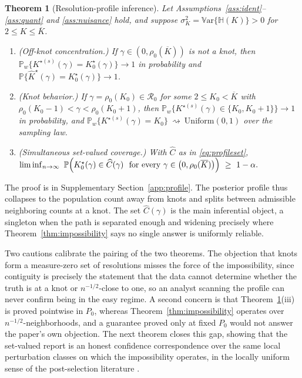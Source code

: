 \documentclass[11pt]{article}
\newtheorem{theorem}{Theorem}%
\newcommand{\Pp}{\mathbb P}
\newcommand{\Var}{\mathbb V\mathrm{ar}}
\newcommand{\dto}{\rightsquigarrow}
\begin{document}
\begin{theorem}[Resolution-profile inference]\label{thm:profile}
Let Assumptions~\ref{ass:ident}--\ref{ass:quant} and \ref{ass:nuisance} hold, and suppose $\sigma_K^2=\Var\{\mathbb H(K)\}>0$ for $2\le K\le\overline K$.
\begin{enumerate}[label=(\roman*),leftmargin=2em]
\item \textup{(Off-knot concentration.)} If $\gamma\in(0,\rho_0(\overline K))$ is not a knot, then $\Pp_w\{K^{\star(s)}(\gamma)=K^\star_0(\gamma)\}\to1$ in probability and $\Pp\{\widehat K^\star(\gamma)=K^\star_0(\gamma)\}\to1$.
\item \textup{(Knot behavior.)} If $\gamma=\rho_0(K_0)\in\mathcal R_0$ for some $2\le K_0<\overline K$ with $\rho_0(K_0-1)<\gamma<\rho_0(K_0+1)$, then $\Pp_w\{K^{\star(s)}(\gamma)\in\{K_0,K_0+1\}\}\to1$ in probability, and $\Pp_w\bigl\{K^{\star(s)}(\gamma)=K_0\bigr\}\ \dto\ \mathrm{Uniform}(0,1)$
over the sampling law.
\item \textup{(Simultaneous set-valued coverage.)} With $\widehat C$ as in \eqref{eq:profileset}, $\liminf_{n\to\infty}\ \Pp\Bigl(K^\star_0(\gamma)\in\widehat C(\gamma)\ \text{ for every }\gamma\in\bigl(0,\rho_0(\overline K)\bigr)\Bigr)\ \ge\ 1-\alpha .$
\end{enumerate}
\end{theorem}
The proof is in Supplementary Section~\ref{app:profile}. The posterior profile thus collapses to the population count away from knots and splits between admissible neighboring counts at a knot. The set $\widehat C(\gamma)$ is the main inferential object, a singleton when the path is separated enough and widening precisely where Theorem~\ref{thm:impossibility} says no single answer is uniformly reliable.

Two cautions calibrate the pairing of the two theorems. The objection that knots form a measure-zero set of resolutions misses the force of the impossibility, since contiguity is precisely the statement that the data cannot determine whether the truth is at a knot or $n^{-1/2}$-close to one, so an analyst scanning the profile can never confirm being in the easy regime. A second concern is that Theorem~\ref{thm:profile}(iii) is proved pointwise in $P_0$, whereas Theorem~\ref{thm:impossibility} operates over $n^{-1/2}$-neighborhoods, and a guarantee proved only at fixed $P_0$ would not answer the paper's own objection. The next theorem closes this gap, showing that the set-valued report is an honest confidence correspondence over the same local perturbation classes on which the impossibility operates, in the locally uniform sense of the post-selection literature \citep{leeb2005,li1989}.
\end{document}
